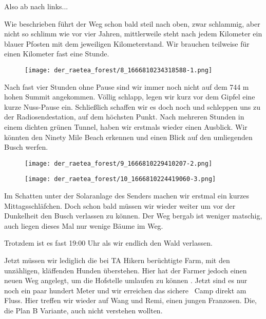   Also ab nach links...
 


  Wie beschrieben führt der Weg schon bald steil nach oben, zwar schlammig, aber nicht so schlimm wie vor vier Jahren, mittlerweile steht nach jedem Kilometer ein blauer Pfosten mit dem jeweiligen Kilometerstand. Wir brauchen teilweise für einen Kilometer fast eine Stunde.
 


\begin{figure}[H]
	\centering
	\texttt{[image: der\_raetea\_forest/8\_1666810234318588-1.png]}
	\caption{}
	\label{fig:8_1666810234318588-1}
\end{figure}

  Nach fast vier Stunden ohne Pause sind wir immer noch nicht auf dem 744 m hohen Summit angekommen. Völlig schlapp, legen wir kurz vor dem Gipfel eine kurze Nuss-Pause ein. Schließlich schaffen wir es doch noch und schleppen uns zu der Radiosendestation, auf dem höchsten Punkt. Nach mehreren Stunden in einem dichten grünen Tunnel, haben wir erstmals wieder einen Ausblick. Wir könnten den Ninety Mile Beach erkennen und einen Blick auf den umliegenden Busch werfen.
 


\begin{figure}[H]
	\centering
	\texttt{[image: der\_raetea\_forest/9\_1666810229410207-2.png]}
	\caption{}
	\label{fig:9_1666810229410207-2}
\end{figure}

\begin{figure}[H]
	\centering
	\texttt{[image: der\_raetea\_forest/10\_1666810224419060-3.png]}
	\caption{}
	\label{fig:10_1666810224419060-3}
\end{figure}

  Im Schatten unter der Solaranlage des Senders machen wir erstmal ein kurzes Mittagsschläfchen. Doch schon bald müssen wir wieder weiter um vor der Dunkelheit den Busch verlassen zu können. Der Weg bergab ist weniger matschig, auch liegen dieses Mal nur wenige Bäume im Weg.
 


  Trotzdem ist es fast 19:00 Uhr als wir endlich den Wald verlassen.
 


  Jetzt müssen wir lediglich die bei TA Hikern berüchtigte Farm, mit den unzähligen, kläffenden Hunden überstehen. Hier hat der Farmer jedoch einen neuen Weg angelegt, um die Hofstelle umlaufen zu können . Jetzt sind es nur noch ein paar hundert Meter und wir erreichen das sichere  Camp direkt am Fluss. Hier treffen wir wieder auf Wang und Remi, einen jungen Franzosen. Die, die Plan B Variante, auch nicht verstehen wollten.
 



